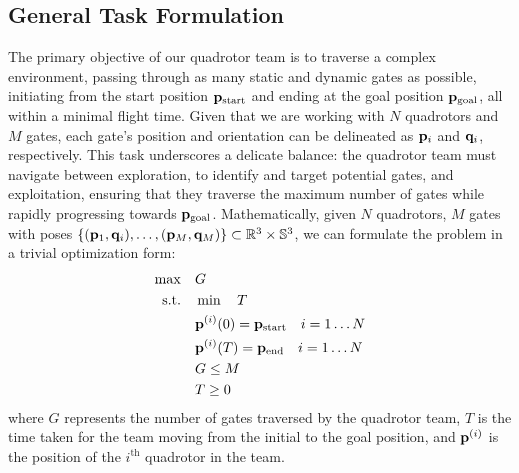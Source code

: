 \documentclass[letterpaper,journal,twoside]{IEEEtran}
\begin{document}
\subsection{General Task Formulation}

The primary objective of our quadrotor team is to traverse a 
complex environment, passing through as many static and 
dynamic gates as possible, initiating from the start position 
$ \mathbf{p}_{\text{start}} $ and ending at the goal position 
$ \mathbf{p}_{\text{goal}} $, all within a minimal flight time. 
Given that we are working with $ N $ quadrotors and $ M $ 
gates, 
each gate's position and orientation can be delineated as 
$ \mathbf{p}_i $
and $ \mathbf{q}_i$, respectively. 
This task underscores a delicate balance: 
the quadrotor team must navigate between 
exploration, to identify and target potential gates, 
and exploitation, 
ensuring that they traverse the maximum number of gates while 
rapidly progressing towards $ \mathbf{p}_{\text{goal}} $.
Mathematically, given $N$ quadrotors, $M$ gates 
with poses $\left\{(\mathbf{p}_1,\mathbf{q}_i), \dots, 
(\mathbf{p}_M, \mathbf{q}_M)\right\} 
\subset \mathbb{R}^3\times\mathbb{S}^3$, we can 
formulate the problem in a trivial optimization form:
\begin{equation}
  \label{eq:general_opt}
  \begin{aligned}
    \max \quad & G \\
    \textrm{s.t.} \quad & \min \quad T \\
    & \mathbf{p}^{(i)}(0) = \mathbf{p}_\text{start} \quad i = 1\dots N \\
    & \mathbf{p}^{(i)}(T) = \mathbf{p}_\text{end} \quad i = 1\dots N \\
    & G \le M \\
    & T \ge 0
  \end{aligned}
\end{equation}
where $G$ represents the number of gates traversed by the 
quadrotor team, $T$ is the time taken for the team moving
from the initial to the goal position, and $\mathbf{p}^{(i)}$ 
is the position of the $i^{\text{th}}$ quadrotor in the 
team. 

\end{document}
